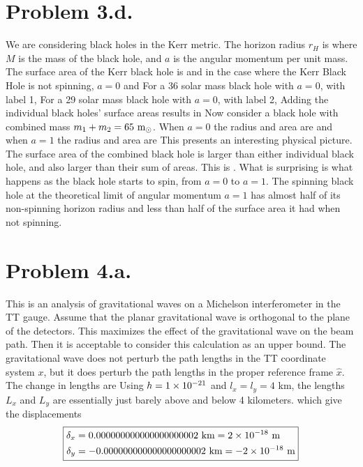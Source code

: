 \documentclass{article}
\begin{document}
\section*{Problem 3.d.}
We are considering black holes in the Kerr metric. The horizon radius $r_H$ is
where $M$ is the mass of the black hole, and $a$ is the angular momentum per unit mass. The surface area of the Kerr black hole is
and in the case where the Kerr Black Hole is not spinning, $a=0$ and
For a 36 solar mass black hole with $a=0$, with label 1,
For a 29 solar mass black hole with $a=0$, with label 2,
Adding the individual black holes' surface areas results in
Now consider a black hole with combined mass $m_1+m_2=65\textrm{ m$_\odot$}$. When $a=0$ the radius and area are
and when $a=1$ the radius and area are
This presents an interesting physical picture. The surface area of the combined black hole is larger than either individual black hole, and also larger than their sum of areas. This is . What is surprising is what happens as the black hole starts to spin, from $a=0$ to $a=1$. The spinning black hole at the theoretical limit of angular momentum $a=1$ has almost half of its non-spinning horizon radius and less than half of the surface area it had when not spinning. 
\section*{Problem 4.a.}
This is an analysis of gravitational waves on a Michelson interferometer in the TT gauge. Assume that the planar gravitational wave is orthogonal to the plane of the detectors. This maximizes the effect of the gravitational wave on the beam path. Then it is acceptable to consider this calculation as an upper bound. The gravitational wave does not perturb the path lengths in the TT coordinate system $x$, but it does perturb the path lengths in the proper reference frame $\hat{x}$. The change in lengths are
Using $h=1\times 10^{-21}$ and $l_x=l_y=4$ km, the lengths $L_x$ and $L_y$ are essentially just barely above and below 4 kilometers.
which give the displacements
\[ \! \boxed{\begin{aligned}
\delta_x &= 0.000000000000000000002\textrm{ km} = 2\times 10^{-18}\textrm{ m}\\
\delta_y &= -0.000000000000000000002\textrm{ km} = -2\times 10^{-18}\textrm{ m}
\end{aligned}} \]
\end{document}

